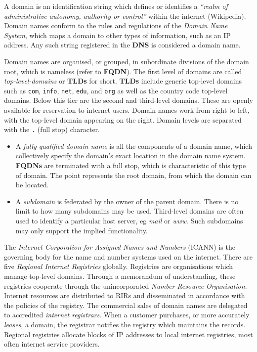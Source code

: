 \documentclass[9pt]{article}
\begin{document}
A domain is an identification string which defines or identifies a \emph{``realm of administrative autonomy, authority or control''} within the internet (Wikipedia). Domain names conform to the rules and regulations of the \emph{Domain Name System}, which maps a domain to other types of information, such as an IP address. Any such string registered in the \textbf{DNS} is considered a domain name.

Domain names are organised, or grouped, in subordinate divisions of the domain root, which is nameless (refer to \textbf{FQDN}). The first level of domains are called \emph{top-level-domains} or \textbf{TLDs} for short. \textbf{TLDs} include generic top-level domains such as \texttt{com}, \texttt{info}, \texttt{net}, \texttt{edu}, and \texttt{org} as well as the country code top-level domains. Below this tier are the second and third-level domains. These are openly available for reservation to internet users. Domain names work from right to left, with the top-level domain appearing on the right. Domain levels are separated with the \texttt{.} (full stop) character.

\begin{itemize}
\item A \emph{fully qualified domain name} is all the components of a domain name, which collectively specify the domain's exact location in the domain name system. \textbf{FQDNs} are terminated with a full stop, which is characteristic of this type of domain. The point represents the root domain, from which the domain can be located.

\item A \emph{subdomain} is federated by the owner of the parent domain. There is no limit to how many subdomains may be used. Third-level domains are often used to identify a particular host server, eg \emph{mail} or \emph{www}. Such subdomains may only support the implied functionality.
\end{itemize}

The \emph{Internet Corporation for Assigned Names and Numbers} (ICANN) is the governing body for the name and number systems used on the internet. There are five \emph{Regional Internet Registries} globally. Registries are organisations which manage top-level domains. Through a memorandum of understanding, these registries cooperate through the unincorporated \emph{Number Resource Organisation}. Internet resources are distributed to RIRs and disseminated in accordance with the policies of the registry. The commercial sales of domain names are delegated to accredited \emph{internet registrars}. When a customer purchases, or more accurately \emph{leases}, a domain, the registrar notifies the registry which maintains the records. Regional registries allocate blocks of IP addresses to local internet registries, most often internet service providers.
\end{document}
